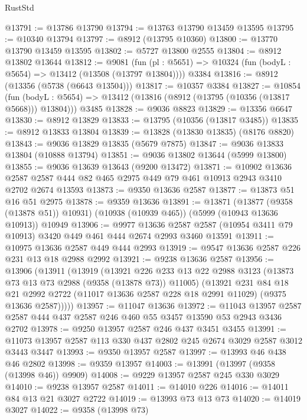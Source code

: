 \begin{lexlean}{RustStd}
\begin{coremodule}
@13791 := @13786 @13790
@13794 := @13763 @13790 @13459 @13595
@13795 := @10340 @13794
@13797 := @8912 (@13795 @10360)
@13800 := @13770 @13790 @13459 @13595
@13802 := @5727 @13800 @2555
@13804 := @8912 @13802 @13644
@13812 := @9081
    (fun (pl : @5651) => @10324 (fun (bodyL : @5654) => @13412 (@13508 (@13797 @13804))))
    @3384
@13816 := @8912 (@13356 (@5738 (@6643 @13504)))
@13817 := @10357 @3384
@13827 := @10854
    (fun (bodyL : @5654) => @13412 (@13816 (@8912 (@13795 (@10356 (@13817 @5668))) @13804)))
    @3485
@13828 := @9036 @8823
@13829 := @13356 @6647
@13830 := @8912 @13829
@13833 := @13795 (@10356 (@13817 @3485))
@13835 := @8912 @13833 @13804
@13839 := @13828 (@13830 @13835) (@8176 @8820)
@13843 := @9036 @13829 @13835 (@5679 @7875)
@13847 := @9036 @13833 @13804 (@10888 @13794)
@13851 := @9036 @13802 @13644 (@5999 @13800)
@13855 := @9036 @13639 @13643 (@9200 @13472)
@13871 := @10902
    @13636
    @2587
    @2587
    @444
    @82
    @465
    @2975
    @449
    @79
    @461
    @10913
    @2943
    @3410
    @2702
    @2674
    @13593
@13873 := @9350 @13636 @2587
@13877 := @13873 @51 @16 @51 @2975
@13878 := @9359 @13636
@13891 := @13871
    (@13877 (@9358 (@13878 @51)) @10931)
    (@10938 (@10939 @465))
    (@5999 (@10943 @13636 @10913))
    @10949
@13906 := @9977
    @13636
    @2587
    @2587
    (@10954 @3411 @79 @10913)
    @3420
    @449
    @461
    @444
    @2674
    @2993
    @3460
    @13591
@13911 := @10975 @13636 @2587 @449 @444 @2993
@13919 := @9547 @13636 @2587 @226 @231 @13 @18 @2988 @2992
@13921 := @9238 @13636 @2587
@13956 := @13906
    (@13911
      (@13919
        (@13921
          @226
          @233
          @13
          @22
          @2988
          @3123
          (@13873 @73 @13 @73 @2988 (@9358 (@13878 @73)) @11005)
          (@13921
            @231
            @84
            @18
            @21
            @2992
            @2722
            (@11017 @13636 @2587 @228 @18 @2991 @11029)
            (@9375 @13636 @2587)))))
@13957 := @11047 @13636
@13972 := @11043 @13957 @2587 @2587 @444 @437 @2587 @246 @460 @55 @3457 @13590 @53 @2943 @3436 @2702
@13978 := @9250 @13957 @2587 @246 @437 @3451 @3455
@13991 := @11073 @13957 @2587 @113 @330 @437 @2802 @245 @2674 @3029 @2587 @3012 @3443 @3447
@13993 := @9350 @13957 @2587
@13997 := @13993 @46 @438 @46 @2802
@13998 := @9359 @13957
@14003 := @13991 (@13997 (@9358 (@13998 @46)) @9909)
@14008 := @9229 @13957 @2587 @245 @330 @3029
@14010 := @9238 @13957 @2587
@14011 := @14010 @226
@14016 := @14011 @84 @13 @21 @3027 @2722
@14019 := @13993 @73 @13 @73
@14020 := @14019 @3027
@14022 := @9358 (@13998 @73)

\end{coremodule}
\end{lexlean}
